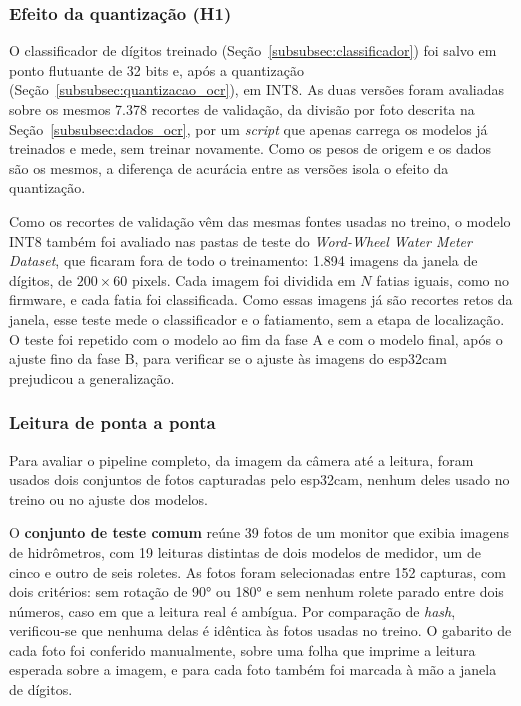 \subsubsection{Efeito da quantização (H1)}
\label{subsubsec:exp_quantizacao}

O classificador de dígitos treinado (Seção~\ref{subsubsec:classificador}) foi salvo em
ponto flutuante de 32 bits e, após a quantização (Seção~\ref{subsubsec:quantizacao_ocr}),
em INT8. As duas versões foram avaliadas sobre os mesmos 7.378 recortes de validação, da
divisão por foto descrita na Seção~\ref{subsubsec:dados_ocr}, por um \textit{script} que
apenas carrega os modelos já treinados e mede, sem treinar novamente. Como os pesos de
origem e os dados são os mesmos, a diferença de acurácia entre as versões isola o efeito
da quantização.

Como os recortes de validação vêm das mesmas fontes usadas no treino, o modelo INT8 também
foi avaliado nas pastas de teste do \textit{Word-Wheel Water Meter Dataset}, que ficaram
fora de todo o treinamento: 1.894 imagens da janela de dígitos, de $200 \times 60$ pixels.
Cada imagem foi dividida em $N$ fatias iguais, como no firmware, e cada fatia foi
classificada. Como essas imagens já são recortes retos da janela, esse teste mede o
classificador e o fatiamento, sem a etapa de localização. O teste foi repetido com o modelo
ao fim da fase A e com o modelo final, após o ajuste fino da fase B, para verificar se o
ajuste às imagens do \gls{esp32cam} prejudicou a generalização.

\subsubsection{Leitura de ponta a ponta}
\label{subsubsec:exp_leitura}

Para avaliar o pipeline completo, da imagem da câmera até a leitura, foram usados dois
conjuntos de fotos capturadas pelo \gls{esp32cam}, nenhum deles usado no treino ou no
ajuste dos modelos.

O \textbf{conjunto de teste comum} reúne 39 fotos de um monitor que exibia imagens de
hidrômetros, com 19 leituras distintas de dois modelos de medidor, um de cinco e outro de
seis roletes. As fotos foram selecionadas entre 152 capturas, com dois critérios: sem
rotação de 90° ou 180° e sem nenhum rolete parado entre dois números, caso em que a
leitura real é ambígua. Por comparação de \textit{hash}, verificou-se que nenhuma delas é
idêntica às fotos usadas no treino. O gabarito de cada foto foi conferido manualmente,
sobre uma folha que imprime a leitura esperada sobre a imagem, e para cada foto também foi
marcada à mão a janela de dígitos.

